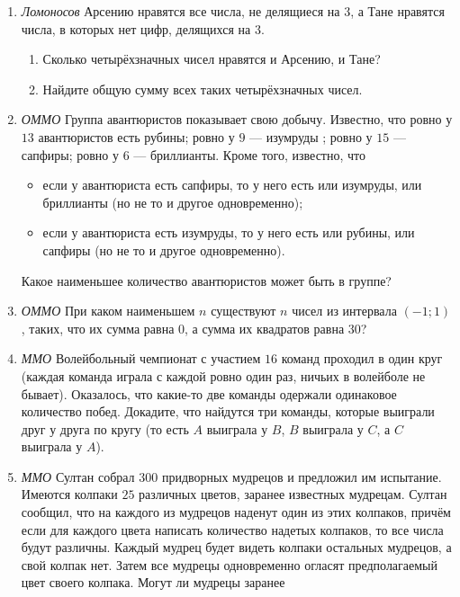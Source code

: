 


\clearpage
\pagestyle{empty}
\begin{enumerate}
    \item \textit{Ломоносов} Арсению нравятся все числа, не делящиеся на $3$, а Тане нравятся числа, в которых нет цифр, делящихся на $3$.
          \begin{enumerate}[label=(\asbuk*)]
              \item Сколько четырёхзначных чисел нравятся и Арсению, и Тане?
              \item Найдите общую сумму всех таких четырёхзначных чисел.
          \end{enumerate}
    \item \textit{ОММО} Группа авантюристов показывает свою добычу. Известно, что ровно у $13$ авантюристов есть рубины; ровно у $9$ --- изумруды ; ровно у $15$ --- сапфиры; ровно у $6$ --- бриллианты. Кроме того, известно, что
          \begin{itemize}
              \item если у авантюриста есть сапфиры, то у него есть или изумруды, или бриллианты (но не то и другое одновременно);
              \item если у авантюриста есть изумруды, то у него есть или рубины, или сапфиры (но не то и другое одновременно).
          \end{itemize}
          Какое наименьшее количество авантюристов может быть в группе?
    \item \textit{ОММО} При каком наименьшем $n$ существуют $n$ чисел из интервала $(-1;1)$, таких, что их сумма равна $0$, а сумма их квадратов равна $30$?
    \item \textit{ММО} Волейбольный чемпионат с участием $16$ команд проходил в один круг (каждая команда играла с каждой ровно один раз, ничьих в волейболе не бывает). Оказалось, что какие-то две команды одержали одинаковое количество побед. Докадите, что найдутся три команды, которые выиграли друг у друга по кругу (то есть $A$ выиграла у $B$, $B$ выиграла у $C$, а $C$ выиграла у $A$).
    \item \textit{ММО} Султан собрал $300$ придворных мудрецов и предложил им испытание. Имеются колпаки $25$ различных цветов, заранее известных мудрецам. Султан сообщил, что
    на каждого из мудрецов наденут один из этих колпаков, причём если для каждого цвета
    написать количество надетых колпаков, то все числа будут различны. Каждый мудрец
    будет видеть колпаки остальных мудрецов, а свой колпак нет. Затем все мудрецы одновременно огласят предполагаемый цвет своего колпака. Могут ли мудрецы заранее

\end{enumerate}
